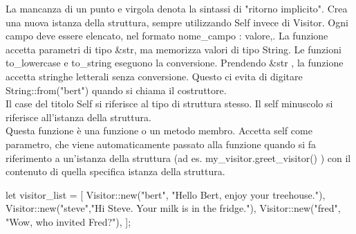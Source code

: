 \documentclass[11pt,a4paper]{article}
\begin{document}
La mancanza di un punto e virgola denota la sintassi di "ritorno implicito". Crea una nuova istanza della struttura, sempre utilizzando Self invece di Visitor. Ogni campo deve essere elencato, nel formato nome\_campo : valore,.
La funzione accetta parametri di tipo \&str, ma memorizza valori di tipo String. Le funzioni to\_lowercase e to\_string eseguono la conversione. Prendendo \&str , la funzione accetta stringhe letterali senza conversione. Questo ci evita di digitare String::from("bert") quando si chiama il costruttore.\\
Il case del titolo Self si riferisce al tipo di struttura stesso. Il self minuscolo si riferisce all'istanza della struttura.\\
Questa funzione è una funzione o un metodo membro. Accetta self come parametro, che viene automaticamente passato alla funzione quando si fa riferimento a un'istanza della struttura (ad es. my\_visitor.greet\_visitor() ) con il contenuto di quella specifica istanza della struttura.
\begin{rust}
let visitor_list = [
	Visitor::new("bert", "Hello Bert, enjoy your treehouse."),
	Visitor::new("steve","Hi Steve. Your milk is in the fridge."),
	Visitor::new("fred", "Wow, who invited Fred?"),
];
\end{rust}
\end{document}
